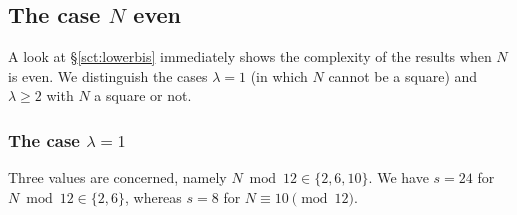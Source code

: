 \documentclass[12pt,twoside,leqno]{article}
\numberwithin{equation}{section}
\renewcommand{\geq}{\geqslant}
\begin{document}
\subsection{The case \texorpdfstring {$N$}{N} even}

A look at \S\ref{sct:lowerbis} immediately shows the complexity
of the results when $N$ is even. We distinguish the cases
$\lambda = 1$ (in which $N$ cannot be a square) and
$\lambda \geq 2$ with $N$ a square or not.

\subsubsection{The case \texorpdfstring {$\lambda = 1$}{lambda=1}}
\label{sssct:lambda1}

Three values are concerned, namely $N\bmod 12 \in \{2, 6, 10\}$. We
have $s = 24$ for $N \bmod 12 \in \{ 2, 6 \}$, whereas $s = 8$
for $N \equiv 10 \pmod {12}$.
\end{document}
